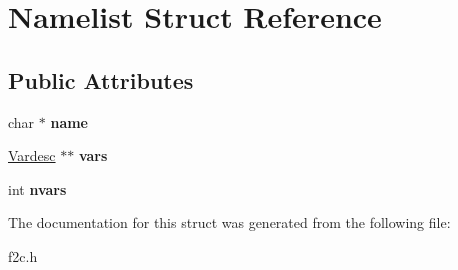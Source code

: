 \hypertarget{structNamelist}{
\section{Namelist Struct Reference}
\label{structNamelist}
}
\subsection*{Public Attributes}
\begin{DoxyCompactItemize}
\item 
\hypertarget{structNamelist_a43f48d333d37610aa80483ee76c78d26}{
char $\ast$ {\bfseries name}}
\label{structNamelist_a43f48d333d37610aa80483ee76c78d26}

\item 
\hypertarget{structNamelist_a5e41f1eccfc8b25536f76c1ced89c3fc}{
\hyperlink{structVardesc}{Vardesc} $\ast$$\ast$ {\bfseries vars}}
\label{structNamelist_a5e41f1eccfc8b25536f76c1ced89c3fc}

\item 
\hypertarget{structNamelist_a30a6e0a05803290fed780890bcc436fa}{
int {\bfseries nvars}}
\label{structNamelist_a30a6e0a05803290fed780890bcc436fa}

\end{DoxyCompactItemize}


The documentation for this struct was generated from the following file:\begin{DoxyCompactItemize}
\item 
f2c.h\end{DoxyCompactItemize}
